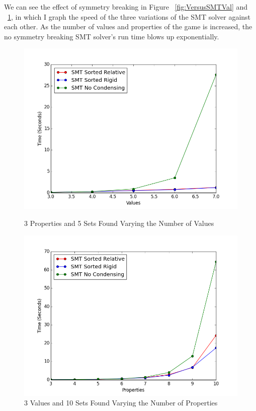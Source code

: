 \documentclass[pageno]{jpaper}
\begin{document}
We can see the effect of symmetry breaking in Figure ~\ref{fig:VersusSMTVal} and ~\ref{fig:VersusSMTProp}, in which I graph the speed of the three variations of the SMT solver against each other. As the number of values and properties of the game is increased, the no symmetry breaking SMT solver's run time blows up exponentially.

\begin{figure}[htbb]
\begin{minipage}[b]{0.5\linewidth}
\centering
\includegraphics[width=.75\linewidth]{VersusSMTVAL-v34567p3n5.png}
\caption{3 Properties and 5 Sets Found Varying the Number of Values}
\label{fig:VersusSMTVal}
\end{minipage}
\hspace{0.5cm}
\begin{minipage}[b]{0.5\linewidth}
\centering
\includegraphics[width=.75\linewidth]{VersusSMTPROP-v3p345678910n5.png}
\caption{3 Values and 10 Sets Found Varying the Number of Properties}
\label{fig:VersusSMTProp}
\end{minipage}
\end{figure}
\end{document}
